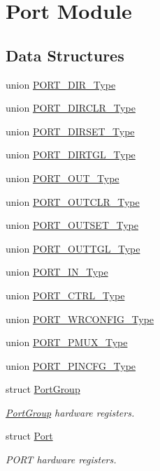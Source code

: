 \hypertarget{group___s_a_m_d21___p_o_r_t}{}\section{Port Module}
\label{group___s_a_m_d21___p_o_r_t}
\subsection*{Data Structures}
\begin{DoxyCompactItemize}
\item 
union \mbox{\hyperlink{union_p_o_r_t___d_i_r___type}{P\+O\+R\+T\+\_\+\+D\+I\+R\+\_\+\+Type}}
\item 
union \mbox{\hyperlink{union_p_o_r_t___d_i_r_c_l_r___type}{P\+O\+R\+T\+\_\+\+D\+I\+R\+C\+L\+R\+\_\+\+Type}}
\item 
union \mbox{\hyperlink{union_p_o_r_t___d_i_r_s_e_t___type}{P\+O\+R\+T\+\_\+\+D\+I\+R\+S\+E\+T\+\_\+\+Type}}
\item 
union \mbox{\hyperlink{union_p_o_r_t___d_i_r_t_g_l___type}{P\+O\+R\+T\+\_\+\+D\+I\+R\+T\+G\+L\+\_\+\+Type}}
\item 
union \mbox{\hyperlink{union_p_o_r_t___o_u_t___type}{P\+O\+R\+T\+\_\+\+O\+U\+T\+\_\+\+Type}}
\item 
union \mbox{\hyperlink{union_p_o_r_t___o_u_t_c_l_r___type}{P\+O\+R\+T\+\_\+\+O\+U\+T\+C\+L\+R\+\_\+\+Type}}
\item 
union \mbox{\hyperlink{union_p_o_r_t___o_u_t_s_e_t___type}{P\+O\+R\+T\+\_\+\+O\+U\+T\+S\+E\+T\+\_\+\+Type}}
\item 
union \mbox{\hyperlink{union_p_o_r_t___o_u_t_t_g_l___type}{P\+O\+R\+T\+\_\+\+O\+U\+T\+T\+G\+L\+\_\+\+Type}}
\item 
union \mbox{\hyperlink{union_p_o_r_t___i_n___type}{P\+O\+R\+T\+\_\+\+I\+N\+\_\+\+Type}}
\item 
union \mbox{\hyperlink{union_p_o_r_t___c_t_r_l___type}{P\+O\+R\+T\+\_\+\+C\+T\+R\+L\+\_\+\+Type}}
\item 
union \mbox{\hyperlink{union_p_o_r_t___w_r_c_o_n_f_i_g___type}{P\+O\+R\+T\+\_\+\+W\+R\+C\+O\+N\+F\+I\+G\+\_\+\+Type}}
\item 
union \mbox{\hyperlink{union_p_o_r_t___p_m_u_x___type}{P\+O\+R\+T\+\_\+\+P\+M\+U\+X\+\_\+\+Type}}
\item 
union \mbox{\hyperlink{union_p_o_r_t___p_i_n_c_f_g___type}{P\+O\+R\+T\+\_\+\+P\+I\+N\+C\+F\+G\+\_\+\+Type}}
\item 
struct \mbox{\hyperlink{struct_port_group}{Port\+Group}}
\begin{DoxyCompactList}\small\item\em \mbox{\hyperlink{struct_port_group}{Port\+Group}} hardware registers. \end{DoxyCompactList}\item 
struct \mbox{\hyperlink{struct_port}{Port}}
\begin{DoxyCompactList}\small\item\em P\+O\+RT hardware registers. \end{DoxyCompactList}\end{DoxyCompactItemize}
